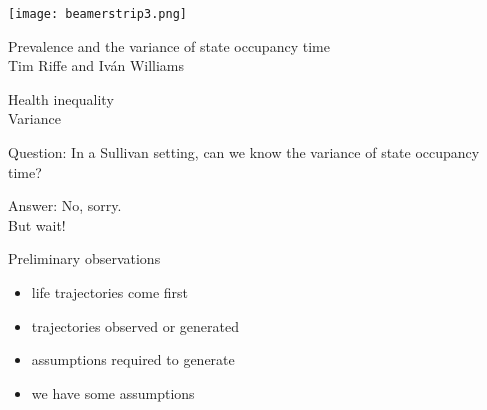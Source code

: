 \documentclass[20pt,usenames,dvipsnames]{beamer}
\begin{document}

\begin{frame}[plain]
	\vspace{-3cm}
 \centerline{\texttt{[image: beamerstrip3.png]}}

	
	\huge
	\vspace{1em}
	
	Prevalence and the variance of state occupancy time\\
	\vspace{1em}
	\large 
	Tim Riffe and Iv\'{a}n Williams 
\end{frame}
\begin{frame}[plain]
\Huge
\begin{center}
Health inequality \\ \vspace{2em}
\pause
Variance
\end{center}
\end{frame}
\begin{frame}[plain]
\Huge
\begin{center}
Question: \pause In a Sullivan setting, can we know the variance of state occupancy time?
\end{center}
\end{frame}
\begin{frame}[plain]
\Huge
\begin{center}
Answer: \pause No, sorry. \pause \\ But wait!
\end{center}
\end{frame}

\begin{frame}[plain]
\Huge
\begin{center}
Preliminary observations \\
\Large \pause
\begin{itemize}[<+->]
\item life trajectories come first
\item trajectories observed or generated
\item assumptions required to generate
\item we have some assumptions
\end{itemize}
\end{center}
\end{frame}
\end{document}
